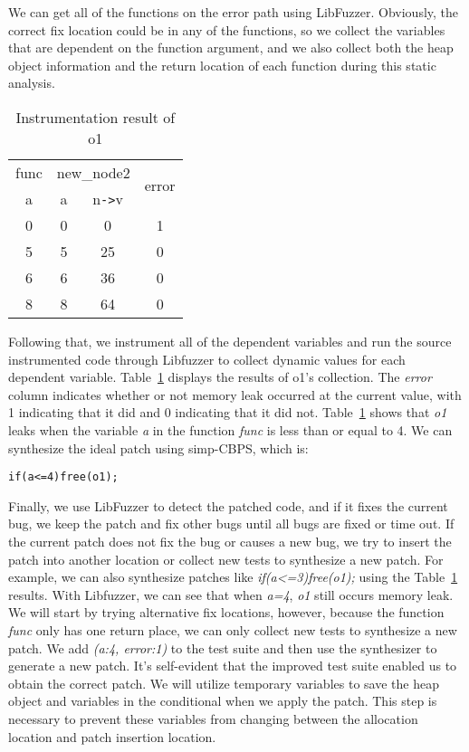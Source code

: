 \documentclass[a4paper,11pt,oneside,openany]{book}
\begin{document}
We can get all of the functions on the error path using LibFuzzer. Obviously, the correct fix location could be in any of the functions, so we collect the variables that are dependent on the function argument, and we also collect both the heap object information and the return location of each function during this static analysis. 

\begin{table}[h]
  \caption{Instrumentation result of o1}
  \label{instres}
  \centering
  \begin{tabular}{|c|c|c|c|}
    \hline
    func  & \multicolumn{2}{|c|}{new\_node2} & \multirow{2}{*}{error} \\
    \cline{1-3}
    a & a & n\verb|->|v &\\
    \hline
     0 & 0  & 0 & 1\\
     5 & 5  & 25 & 0\\
     6 & 6  & 36 & 0\\
     8 & 8  & 64 & 0\\
    \hline
  \end{tabular}
\end{table}

Following that, we instrument all of the dependent variables and run the source instrumented code through Libfuzzer to collect dynamic values for each dependent variable. Table~\ref{instres} displays the results of o1's collection. The {\it error} column indicates whether or not memory leak occurred at the current value, with 1 indicating that it did and 0 indicating that it did not. Table~\ref{instres} shows that {\it o1} leaks when the variable {\it a} in the function {\it func} is less than or equal to 4. We can synthesize the ideal patch using simp-CBPS, which is:

\begin{minipage}{\textwidth}
\vspace{0.2cm}
\hspace{0.3cm}
\raggedright
\verb|if(a<=4)free(o1);|
\label{patch1}
\vspace{0.2cm}
\end{minipage}

Finally, we use LibFuzzer to detect the patched code, and if it fixes the current bug, we keep the patch and fix other bugs until all bugs are fixed or time out. If the current patch does not fix the bug or causes a new bug, we try to insert the patch into another location or collect new tests to synthesize a new patch. For example, we can also synthesize patches like {\it if(a<=3)free(o1);} using the Table~\ref{instres} results. With Libfuzzer, we can see that when {\it a=4}, {\it o1} still occurs memory leak. We will start by trying alternative fix locations, however, because the function {\it func} only has one return place, we can only collect new tests to synthesize a new patch. We add {\it (a:4, error:1)} to the test suite and then use the synthesizer to generate a new patch. It's self-evident that the improved test suite enabled us to obtain the correct patch. We will utilize temporary variables to save the heap object and variables in the conditional when we apply the patch. This step is necessary to prevent these variables from changing between the allocation location and patch insertion location.
\end{document}
